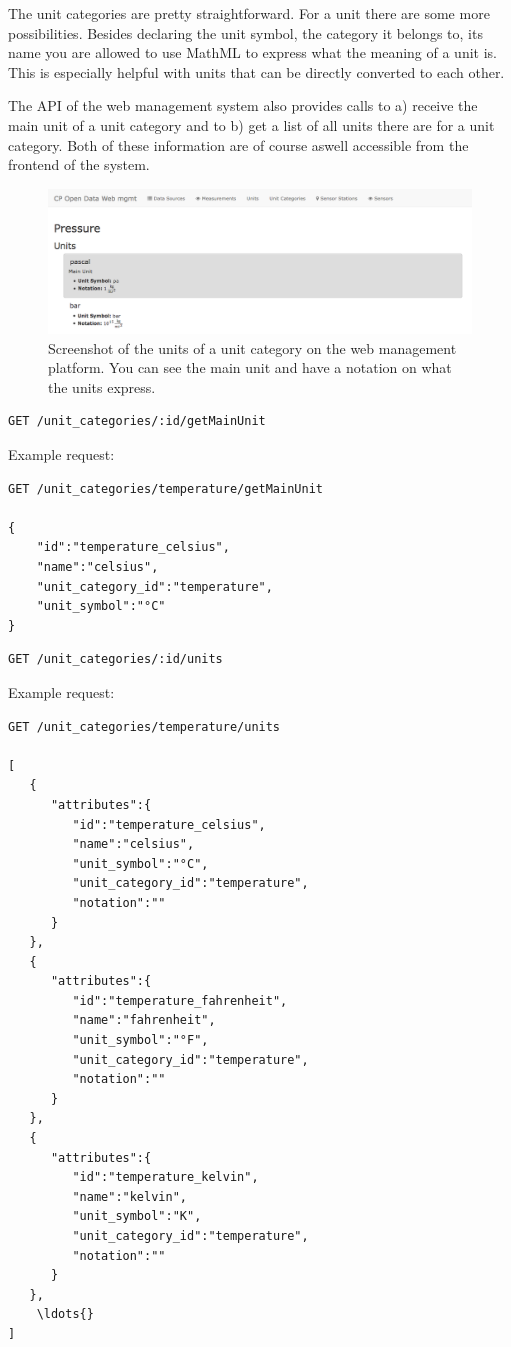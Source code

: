 The unit categories are pretty straightforward. For a unit there are
some more possibilities. Besides declaring the unit symbol, the category
it belongs to, its name you are allowed to use MathML to express what
the meaning of a unit is. This is especially helpful with units that can
be directly converted to each other.

The API of the web management system also provides calls to a) receive
the main unit of a unit category and to b) get a list of all units there
are for a unit category. Both of these information are of course aswell
accessible from the frontend of the system.

\begin{figure}[b]
	\includegraphics[width=1.00\textwidth]{images/unit_frontend.png}
	\caption{Screenshot of the units of a unit category on the web management platform. You can see the main unit and have a notation on what the units express.}
	\label{fig:screen-units}
\end{figure}

\begin{verbatim}
GET /unit_categories/:id/getMainUnit
\end{verbatim}

Example request:

\begin{verbatim}
GET /unit_categories/temperature/getMainUnit

{
    "id":"temperature_celsius",
    "name":"celsius",
    "unit_category_id":"temperature",
    "unit_symbol":"°C"
}
\end{verbatim}

\begin{verbatim}
GET /unit_categories/:id/units
\end{verbatim}

Example request:

\begin{verbatim}
GET /unit_categories/temperature/units

[  
   {  
      "attributes":{  
         "id":"temperature_celsius",
         "name":"celsius",
         "unit_symbol":"°C",
         "unit_category_id":"temperature",
         "notation":""
      }
   },
   {  
      "attributes":{  
         "id":"temperature_fahrenheit",
         "name":"fahrenheit",
         "unit_symbol":"°F",
         "unit_category_id":"temperature",
         "notation":""
      }
   },
   {  
      "attributes":{  
         "id":"temperature_kelvin",
         "name":"kelvin",
         "unit_symbol":"K",
         "unit_category_id":"temperature",
         "notation":""
      }
   },
	\ldots{}
]
\end{verbatim}

